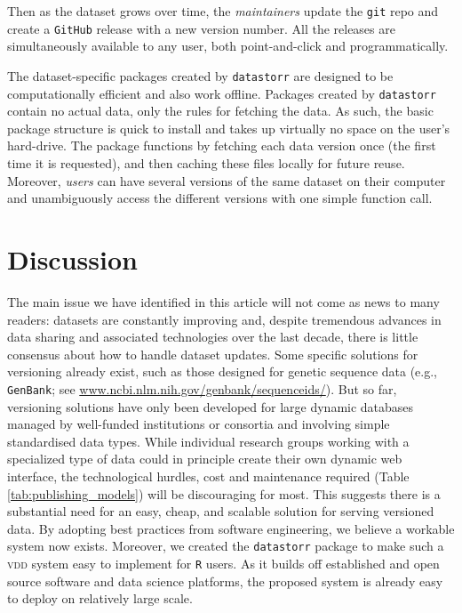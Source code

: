 \documentclass[a4paper,11pt]{article}
\newcommand{\smurl}[1]{{\footnotesize\href{https://#1}{#1}}}
\begin{document}
Then as the dataset grows over time, the \emph{maintainers} update the \texttt{git} repo and create a \texttt{GitHub} release with a new version number. All the releases are simultaneously available to any user, both point-and-click and programmatically.

The dataset-specific packages created by \texttt{datastorr} are designed to be computationally efficient and also work offline. Packages created by \texttt{datastorr} contain no actual data, only the rules for fetching the data. As such, the basic package structure is quick to install and takes up virtually no space on the user's hard-drive. The package functions by fetching each data version once (the first time it is requested), and then caching these files locally for future reuse. Moreover, \emph{users} can have several versions of the same dataset on their computer and unambiguously access the different versions with one simple function call.

\section{Discussion}

The main issue we have identified in this article will not come as news to many readers: datasets are constantly improving and, despite tremendous advances in data sharing and associated technologies over the last decade, there is little consensus about how to handle dataset updates. Some specific solutions for versioning already exist, such as those designed for genetic sequence data (e.g., \texttt{GenBank}; see \smurl{www.ncbi.nlm.nih.gov/genbank/sequenceids/}). But so far, versioning solutions have only been developed for large dynamic databases managed by well-funded institutions or consortia and involving simple standardised data types. While individual research groups working with a specialized type of data could in principle create their own dynamic web interface, the technological hurdles, cost and maintenance required (Table \ref{tab:publishing_models}) will be discouraging for most. This suggests there is a substantial need for an easy, cheap, and scalable solution for serving versioned data. By adopting best practices from software engineering, we believe a workable system now exists. Moreover, we created the \texttt{datastorr} package to make such a \textsc{vdd} system easy to implement for \texttt{R} users. As it builds off established and open source software and data science platforms, the proposed system is already easy to deploy on relatively large scale.
\end{document}
